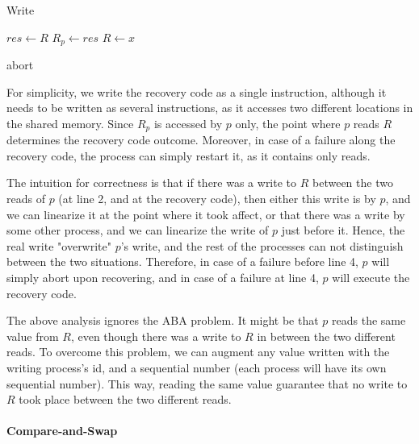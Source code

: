 \begin{algorithm}
	\caption{Write}\label{euclid}
	\begin{algorithmic}[1]
		\State $res \gets R$
		\State $R_{p} \gets res$
		\State $R \gets x$
		\EndProcedure
		
		 \Return abort
		\EndIf
		\EndProcedure
	\end{algorithmic}
\end{algorithm}

For simplicity, we write the recovery code as a single instruction, although it needs to be written as several instructions, as it accesses two different locations in the shared memory. Since $R_p$ is accessed by $p$ only, the point where $p$ reads $R$ determines the recovery code outcome. Moreover, in case of a failure along the recovery code, the process can simply restart it, as it contains only reads.

The intuition for correctness is that if there was a write to $R$ between the two reads of $p$ (at line 2, and at the recovery code), then either this write is by $p$, and we can linearize it at the point where it took affect, or that there was a write by some other process, and we can linearize the write of $p$ just before it. Hence, the real write "overwrite" $p$'s write, and the rest of the processes can not distinguish between the two situations. Therefore, in case of a failure before line 4, $p$ will simply abort upon recovering, and in case of a failure at line 4, $p$ will execute the recovery code.

The above analysis ignores the ABA problem. It might be that $p$ reads the same value from $R$, even though there was a write to $R$ in between the two different reads. To overcome this problem, we can augment any value written with the writing process's id, and a sequential number (each process will have its own sequential number). This way, reading the same value guarantee that no write to $R$ took place between the two different reads.


\paragraph*{Compare-and-Swap}

